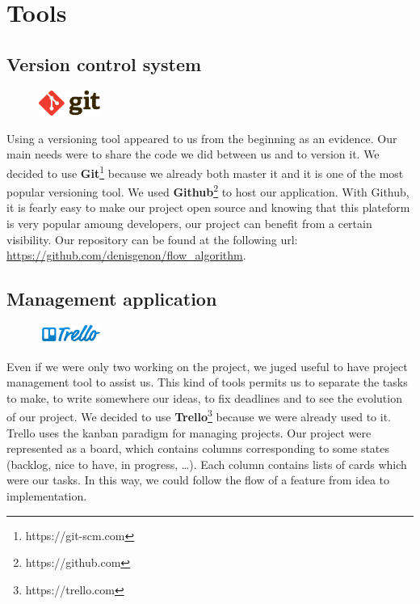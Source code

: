 \section{Tools}

\subsection{Version control system}

\begin{figure}
	\vspace{-5mm}
	\includegraphics[width =2cm]{images/Git-logo.png}
\end{figure}

Using a versioning tool appeared to us from the beginning as an evidence. Our main needs were to share the code we did between us and to version it. We decided to use \textbf{Git}\footnote{https://git-scm.com} because we already both master it and it is one of the most popular versioning tool. We used \textbf{Github}\footnote{https://github.com} to host our application. With Github, it is fearly easy to make our project open source and knowing that this plateform is very popular amoung developers, our project can benefit from a certain visibility. Our repository can be found at the following url: \url{https://github.com/denisgenon/flow_algorithm}.

\subsection{Management application}

\begin{figure}
	\vspace{-5mm}
	\includegraphics[width =2cm]{images/Trello_Logo.png}
\end{figure}


Even if we were only two working on the project, we juged useful to have project management tool to assist us. This kind of tools permits us to separate the tasks to make, to write somewhere our ideas, to fix deadlines and to see the evolution of our project. We decided to use \textbf{Trello}\footnote{https://trello.com} because we were already used to it. Trello uses the kanban paradigm for managing projects. Our project were represented as a board, which contains columns corresponding to some states (backlog, nice to have, in progress, \dots). Each column contains lists of cards which were our tasks. In this way, we could follow the flow of a feature from idea to implementation.

